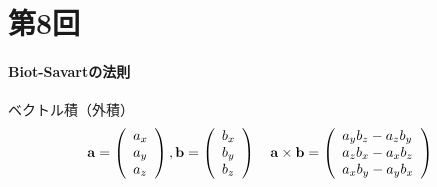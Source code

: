 \documentclass[../main]{subfiles}
\begin{document}
\clearpage

\setcounter{eqnarray}{0}
\setcounter{equation}{0}
\setcounter{figure}{0}

\part*{第8回}

\subsection{Biot-Savartの法則}
\begin{itembox}[c]{ベクトル積（外積）}
\begin{equation*}
{\bf a}= \left(
\begin{array}{l}
a_x \\
a_y \\
a_z
\end{array}
\right)
,
{\bf b}= \left(
\begin{array}{l}
b_x \\
b_y \\
b_z
\end{array}
\right)
\quad
{\bf a} \times {\bf b} =\left(
\begin{array}{l}
a_yb_z-a_zb_y \\
a_zb_x-a_xb_z \\
a_xb_y-a_yb_x
\end{array}
\right)
\end{equation*}
\end{itembox}
\end{document}
